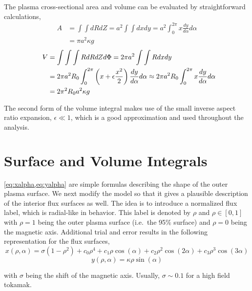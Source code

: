 The plasma cross-sectional area and volume can be evaluated by straightforward calculations,
\begin{equation}
\begin{split}
	A & = \int \int dR dZ = a^2 \int \int dx dy = a^2 \int_0^{2 \pi} x \frac{dy}{d\alpha} d\alpha \\ & = \pi a^2 \kappa g
\end{split}
\end{equation}
\begin{equation}
\begin{split}
	\volume & = \int \int \int R dR dZ d\Phi = 2 \pi a^2 \int \int R dx dy \\ & = 2 \pi a^2 R_0 \int_0^{2 \pi} \left( x + \epsilon \frac{ x^2 }{ 2} \right) \frac{dy}{d\alpha} d\alpha \approx 2 \pi a^2 R_0 \int_0^{2 \pi} x \frac{dy}{d\alpha} d\alpha \\ & = 2 \pi^2 R_0 a^2 \kappa g
\end{split}
\end{equation}

The second form of the volume integral makes use of the small inverse aspect ratio expansion, $\epsilon \ll 1 $, which is a good approximation and used throughout the analysis.

\section{Surface and Volume Integrals}

\cref{eq:xalpha,eq:yalpha} are simple formulas describing the shape of the outer plasma surface. We next modify the model so that it gives a plausible description of the interior flux surfaces as well. The idea is to introduce a normalized flux label, which is radial-like in behavior. This label is denoted by $\rho$ and $\rho \in [0,1]$ with $\rho = 1$ being the outer plasma surface (i.e.\ the 95\% surface) and $\rho = 0$ being the magnetic axis. Additional trial and error results in the following representation for the flux surfaces,
\begin{equation}
	x(\rho,\alpha) = \sigma( 1 - \rho^2 ) + c_0 \rho^4 + c_1 \rho \cos(\alpha) + c_2 \rho^2 \cos(2\alpha) + 
		c_3 \rho^3 \cos(3\alpha)
\end{equation}
\begin{equation}
	y(\rho, \alpha) = \kappa \rho \sin(\alpha)
\end{equation}

with $\sigma$ being the shift of the magnetic axis. Usually, $\sigma \sim 0.1$ for a high field tokamak.

